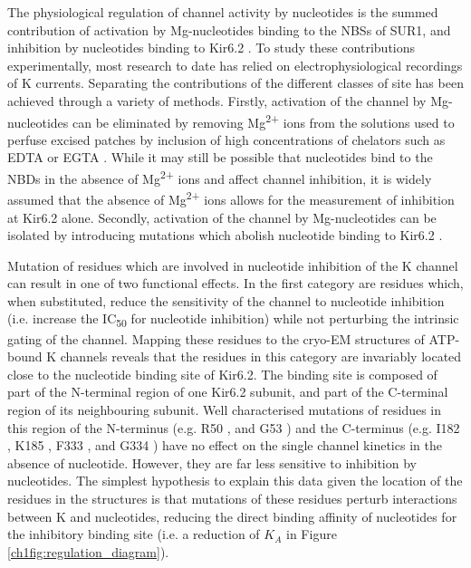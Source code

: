 The physiological regulation of channel activity by nucleotides is the summed contribution of activation by Mg-nucleotides binding to the NBSs of SUR1, and inhibition by nucleotides binding to Kir6.2 \cite{nichols_adenosine_1996}.
To study these contributions experimentally, most research to date has relied on electrophysiological recordings of K\ATP{} currents.
Separating the contributions of the different classes of site has been achieved through a variety of methods.
Firstly, activation of the channel by Mg-nucleotides can be eliminated by removing Mg\textsuperscript{2+} ions from the solutions used to perfuse excised patches by inclusion of high concentrations of chelators such as EDTA or EGTA \cite{gribble_mgatp_1998-1, proks_activation_2010-1}.
While it may still be possible that nucleotides bind to the NBDs in the absence of Mg\textsuperscript{2+} ions and affect channel inhibition, it is widely assumed that the absence of Mg\textsuperscript{2+} ions allows for the measurement of inhibition at Kir6.2 alone. 
Secondly, activation of the channel by Mg-nucleotides can be isolated by introducing mutations which abolish nucleotide binding to Kir6.2 \cite{gribble_mgatp_1998-1, proks_activation_2010-1}.

Mutation of residues which are involved in nucleotide inhibition of the K\ATP{} channel can result in one of two functional effects.
In the first category are residues which, when substituted, reduce the sensitivity of the channel to nucleotide inhibition (i.e. increase the IC\textsubscript{50} for nucleotide inhibition) while not perturbing the intrinsic gating of the channel.
Mapping these residues to the cryo-EM structures of ATP-bound K\ATP{} channels reveals that the residues in this category are invariably located close to the nucleotide binding site of Kir6.2.
The binding site is composed of part of the N-terminal region of one Kir6.2 subunit, and part of the C-terminal region of its neighbouring subunit.
Well characterised mutations of residues in this region of the N-terminus (e.g. R50 \cite{proks_involvement_1999, cukras_role_2002, john_molecular_2003, ribalet_molecular_2003, trapp_identification_2003, shimomura_mutations_2006}, and G53 \cite{koster_dend_2008}) and the C-terminus (e.g. I182 \cite{drain_katp_1998, koster_atp_2005, li_i182_2000}, K185 \cite{john_molecular_2003, ribalet_molecular_2003, trapp_identification_2003}, F333 \cite{tammaro_kir62_2005}, and G334 \cite{drain_katp_1998, tammaro_kir62_2005, masia_atp-binding_2007-1, proks_activation_2010-1}) have no effect on the single channel kinetics in the absence of nucleotide.
However, they are far less sensitive to inhibition by nucleotides.
The simplest hypothesis to explain this data given the location of the residues in the structures is that mutations of these residues perturb interactions between K\ATP{} and nucleotides, reducing the direct binding affinity of nucleotides for the inhibitory binding site (i.e. a reduction of $K_A$ in Figure \ref{ch1fig:regulation_diagram}).

